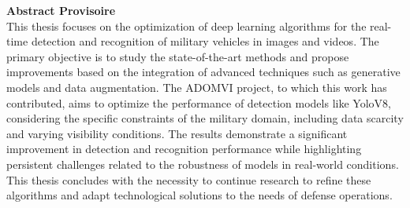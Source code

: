 \sloppy

\textbf{Abstract Provisoire}\\

This thesis focuses on the optimization of deep learning algorithms for the real-time detection and recognition of military vehicles in images and videos.
The primary objective is to study the state-of-the-art methods and propose improvements based on the integration of advanced techniques such as generative models and data augmentation.
The ADOMVI project, to which this work has contributed, aims to optimize the performance of detection models like YoloV8, considering the specific constraints of the military domain, including data scarcity and varying visibility conditions.
The results demonstrate a significant improvement in detection and recognition performance while highlighting persistent challenges related to the robustness of models in real-world conditions.
This thesis concludes with the necessity to continue research to refine these algorithms and adapt technological solutions to the needs of defense operations.


